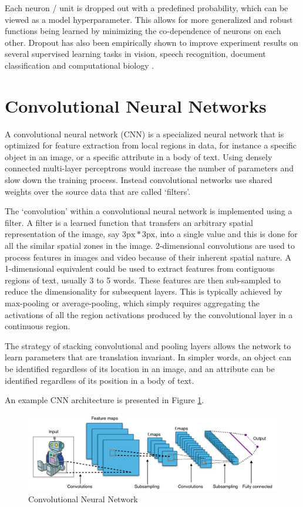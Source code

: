Each neuron / unit is dropped out with a predefined probability, which can be viewed as a model hyperparameter. This allows for more generalized and robust functions being learned by minimizing the co-dependence of neurons on each other. Dropout has also been empirically shown to improve experiment results on several supervised learning tasks in vision, speech recognition, document classification and computational biology \citep{srivastava2014dropout}.


\section{Convolutional Neural Networks}

A convolutional neural network (CNN) \cite{lecun1995convolutional} is a specialized neural network that is optimized for feature extraction from local regions in data, for instance a specific object in an image, or a specific attribute in a body of text. Using densely connected multi-layer perceptrons would increase the number of parameters and slow down the training process. Instead convolutional networks use shared weights over the source data that are called `filters'.

The `convolution' within a convolutional neural network is implemented using a filter. A filter is a learned function that transfers an arbitrary spatial representation of the image, say $3\text{px} * 3\text{px}$, into a single value and this is done for all the similar spatial zones in the image. 2-dimensional convolutions are used to process features in images and video because of their inherent spatial nature. A 1-dimensional equivalent could be used to extract features from contiguous regions of text, usually 3 to 5 words. These features are then sub-sampled to reduce the dimensionality for subsequent layers. This is typically achieved by max-pooling or average-pooling, which simply requires aggregating the activations of all the region activations produced by the convolutional layer in a continuous region.

The strategy of stacking convolutional and pooling layers allows the network to learn parameters that are translation invariant. In simpler words, an object can be identified regardless of its location in an image, and an attribute can be identified regardless of its position in a body of text.

An example CNN architecture is presented in Figure \ref{fig:cnn}.

\begin{figure}[ht]
	\centering
	\includegraphics[width=\textwidth]{images/cnn}
	\caption{\label{fig:cnn} Convolutional Neural Network}
\end{figure}


